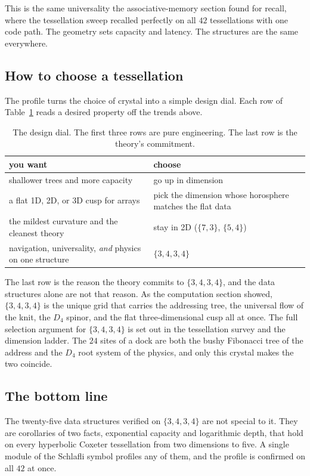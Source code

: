 This is the same universality the associative-memory section found for recall, where the tessellation sweep recalled perfectly on all $42$ tessellations with one code path. The geometry sets capacity and latency. The structures are the same everywhere.

\subsection{How to choose a tessellation}

The profile turns the choice of crystal into a simple design dial. Each row of Table~\ref{tab:choose} reads a desired property off the trends above.

\begin{table}[ht]
\centering
\begin{tabular}{@{}ll@{}}
\toprule
you want & choose \\
\midrule
shallower trees and more capacity & go up in dimension \\
a flat 1D, 2D, or 3D cusp for arrays & pick the dimension whose horosphere matches the flat data \\
the mildest curvature and the cleanest theory & stay in 2D ($\{7,3\}$, $\{5,4\}$) \\
navigation, universality, \emph{and} physics on one structure & $\{3,4,3,4\}$ \\
\bottomrule
\end{tabular}
\caption{The design dial. The first three rows are pure engineering. The last row is the theory's commitment.}
\label{tab:choose}
\end{table}

The last row is the reason the theory commits to $\{3,4,3,4\}$, and the data structures alone are not that reason. As the computation section showed, $\{3,4,3,4\}$ is the unique grid that carries the addressing tree, the universal flow of the knit, the $D_4$ spinor, and the flat three-dimensional cusp all at once. The full selection argument for $\{3,4,3,4\}$ is set out in the tessellation survey and the dimension ladder. The $24$ sites of a dock are both the bushy Fibonacci tree of the address and the $D_4$ root system of the physics, and only this crystal makes the two coincide.

\subsection{The bottom line}

The twenty-five data structures verified on $\{3,4,3,4\}$ are not special to it. They are corollaries of two facts, exponential capacity and logarithmic depth, that hold on every hyperbolic Coxeter tessellation from two dimensions to five. A single module of the Schlafli symbol profiles any of them, and the profile is confirmed on all $42$ at once.

